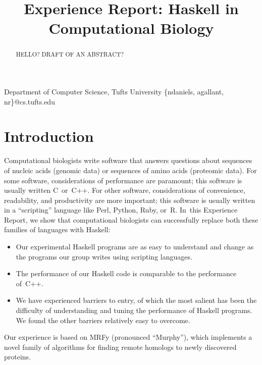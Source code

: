 \documentclass[preprint,nocopyrightspace,times]{sigplanconf}
\begin{document}
\copyrightdata{[to be supplied]} 


\title{Experience Report: Haskell in Computational Biology}

           {Department of Computer Science, Tufts University}
           {\{ndaniels, agallant, nr\}@cs.tufts.edu}


\maketitle

\begin{abstract}
HELLO?  DRAFT OF AN ABSTRACT?
\end{abstract}

% 
% 

\section{Introduction}

Computational biologists write software that answers questions about 
sequences of nucleic acids (genomic data) or sequences of amino 
acids (proteomic data). 
For some software, considerations of performance are paramount; this
software is usually written C~or~C++. 
For other software, considerations of convenience, readability, and
productivity are more important;
this software is usually written in a ``scripting'' language like
Perl, Python, Ruby, or~R.
In~this Experience Report, we show that computational biologists can
successfully replace both these families of languages with Haskell:
\begin{itemize}
\item
Our experimental Haskell programs are as easy to understand and change
 as the programs our group writes using scripting languages.
\item
The performance of our Haskell code is comparable to the performance
of~C++.
\item
We have experienced barriers to entry, of which the most salient has been
the difficulty of understanding and tuning  the performance of Haskell
programs. 
We found the other barriers 
relatively easy to overcome.
\end{itemize}
Our experience is based on MRFy (pronounced ``Murphy''), which
implements a novel family of algorithms for finding remote homologs to 
newly discovered proteins. 
\end{document}
